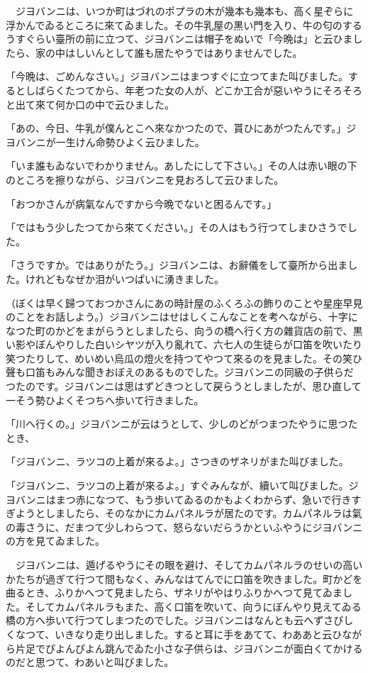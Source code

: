 \documentclass[tate,paper=b6j,jafontsize=9pt]{jlreq}
\begin{document}
　ジヨバンニは、いつか町はづれのポプラの木が幾本も幾本も、高く星ぞらに浮かんでゐるところに來てゐました。その牛乳屋の黒い門を入り、牛の匂のするうすぐらい臺所の前に立つて、ジヨバンニは帽子をぬいで「今晩は」と云ひましたら、家の中はしいんとして誰も居たやうではありませんでした。

「今晩は、ごめんなさい。」ジヨバンニはまつすぐに立つてまた叫びました。するとしばらくたつてから、年老つた女の人が、どこか工合が惡いやうにそろそろと出て來て何か口の中で云ひました。

「あの、今日、牛乳が僕んとこへ來なかつたので、貰ひにあがつたんです。」ジヨバンニが一生けん命勢ひよく云ひました。

「いま誰もゐないでわかりません。あしたにして下さい。」その人は赤い眼の下のところを擦りながら、ジヨバンニを見おろして云ひました。

「おつかさんが病氣なんですから今晩でないと困るんです。」

「ではもう少したつてから來てください。」その人はもう行つてしまひさうでした。

「さうですか。ではありがたう。」ジヨバンニは、お辭儀をして臺所から出ました。けれどもなぜか泪がいつぱいに湧きました。

（ぼくは早く歸つておつかさんにあの時計屋のふくろふの飾りのことや星座早見のことをお話しよう。）ジヨバンニはせはしくこんなことを考へながら、十字になつた町のかどをまがらうとしましたら、向うの橋へ行く方の雜貨店の前で、黒い影やぼんやりした白いシヤツが入り亂れて、六七人の生徒らが口笛を吹いたり笑つたりして、めいめい烏瓜の燈火を持つてやつて來るのを見ました。その笑ひ聲も口笛もみんな聞きおぼえのあるものでした。ジヨバンニの同級の子供らだつたのです。ジヨバンニは思はずどきつとして戻らうとしましたが、思ひ直して一そう勢ひよくそつちへ歩いて行きました。

「川へ行くの。」ジヨバンニが云はうとして、少しのどがつまつたやうに思つたとき、

「ジヨバンニ、ラツコの上着が來るよ。」さつきのザネリがまた叫びました。

「ジヨバンニ、ラツコの上着が來るよ。」すぐみんなが、續いて叫びました。ジヨバンニはまつ赤になつて、もう歩いてゐるのかもよくわからず、急いで行きすぎようとしましたら、そのなかにカムパネルラが居たのです。カムパネルラは氣の毒さうに、だまつて少しわらつて、怒らないだらうかといふやうにジヨバンニの方を見てゐました。

　ジヨバンニは、遁げるやうにその眼を避け、そしてカムパネルラのせいの高いかたちが過ぎて行つて間もなく、みんなはてんでに口笛を吹きました。町かどを曲るとき、ふりかへつて見ましたら、ザネリがやはりふりかへつて見てゐました。そしてカムパネルラもまた、高く口笛を吹いて、向うにぼんやり見えてゐる橋の方へ歩いて行つてしまつたのでした。ジヨバンニはなんとも云へずさびしくなつて、いきなり走り出しました。すると耳に手をあてて、わああと云ひながら片足でぴよんぴよん跳んでゐた小さな子供らは、ジヨバンニが面白くてかけるのだと思つて、わあいと叫びました。
\end{document}
